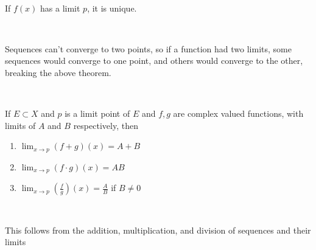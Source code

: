 \documentclass{article}
\begin{document}
\begin{corollary}
\

If $f(x)$ has a limit $p$, it is unique.
\end{corollary}

\begin{customproof}
\

Sequences can't converge to two points, so if a function had two limits, some sequences would converge to one point, and others would converge to the other, breaking the above theorem.
\end{customproof}

\begin{theorem}
\

If $E \subset X$ and $p$ is a limit point of $E$ and $f, g$ are complex valued functions, with limits of $A$ and $B$ respectively, then

\begin{enumerate}
    \item $\lim_{x \to p} (f+g)(x) = A+B$
    \item $\lim_{x \to p} (f \cdot g)(x) = AB$
    \item $\lim_{x \to p} (\frac{f}{g})(x) = \frac{A}{B}$ if $B \neq 0$
\end{enumerate}
\end{theorem}

\begin{customproof}
\

This follows from the addition, multiplication, and division of sequences and their limits
\end{customproof}
\end{document}
